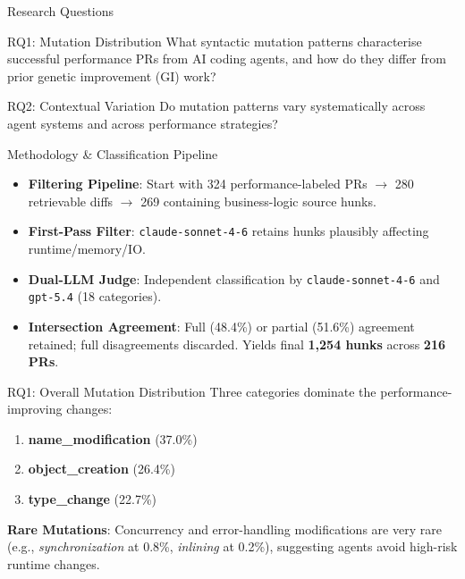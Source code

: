 \documentclass[aspectratio=169]{beamer}
\begin{document}
\begin{frame}{Research Questions}
  \begin{alertblock}{RQ1: Mutation Distribution}
    What syntactic mutation patterns characterise successful performance PRs from AI coding agents, and how do they differ from prior genetic improvement (GI) work?
  \end{alertblock}

  \begin{alertblock}{RQ2: Contextual Variation}
    Do mutation patterns vary systematically across agent systems and across performance strategies?
  \end{alertblock}
\end{frame}

\begin{frame}{Methodology \& Classification Pipeline}
  \begin{itemize}
    \item \textbf{Filtering Pipeline}: Start with 324 performance-labeled PRs $\rightarrow$ 280 retrievable diffs $\rightarrow$ 269 containing business-logic source hunks.
    \item \textbf{First-Pass Filter}: \texttt{claude-sonnet-4-6} retains hunks plausibly affecting runtime/memory/IO.
    \item \textbf{Dual-LLM Judge}: Independent classification by \texttt{claude-sonnet-4-6} and \texttt{gpt-5.4} (18 categories).
    \item \textbf{Intersection Agreement}: Full (48.4\%) or partial (51.6\%) agreement retained; full disagreements discarded. Yields final \textbf{1,254 hunks} across \textbf{216 PRs}.
  \end{itemize}
\end{frame}

\begin{frame}{RQ1: Overall Mutation Distribution}
  Three categories dominate the performance-improving changes:
  \begin{enumerate}
    \item \textbf{name\_modification} (37.0\%)
    \item \textbf{object\_creation} (26.4\%)
    \item \textbf{type\_change} (22.7\%)
  \end{enumerate}
  
  \vspace{0.3cm}
  \textbf{Rare Mutations}: Concurrency and error-handling modifications are very rare (e.g., \emph{synchronization} at 0.8\%, \emph{inlining} at 0.2\%), suggesting agents avoid high-risk runtime changes.
\end{frame}
\end{document}
